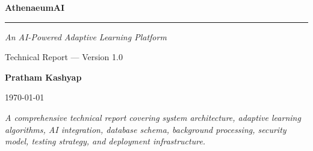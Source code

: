 \documentclass[12pt,a4paper]{article}
\begin{document}
\begin{titlepage}
    \centering
    \vspace*{3cm}

    {\Huge \bfseries \textcolor{primary}{AthenaeumAI}\par}
    \vspace{0.5cm}
    \rule{0.6\textwidth}{1pt}\par
    \vspace{1cm}
    {\Large \itshape An AI-Powered Adaptive Learning Platform\par}
    \vspace{0.5cm}
    {\large Technical Report --- Version 1.0\par}

    \vspace{4cm}

    {\Large \bfseries Pratham Kashyap\par}
    \vspace{0.5cm}
    {\large \today\par}

    \vfill

    {\normalsize \textit{A comprehensive technical report covering system architecture, adaptive learning algorithms, AI integration, database schema, background processing, security model, testing strategy, and deployment infrastructure.}\par}
\end{titlepage}

\newpage

\begin{abstract}
\noindent AthenaeumAI is a full-stack, AI-powered learning platform that generates quizzes, flashcards, analytics, and tutoring experiences from uploaded study material. Unlike static quiz generators, AthenaeumAI tracks per-topic mastery using exponential decay models, implements the SM-2 spaced repetition algorithm for flashcard scheduling, and employs a Retrieval-Augmented Generation (RAG) pipeline for hallucination-resistant AI tutoring. The system uses a containerized microservices architecture with React, Node.js/Express, MongoDB (with replica-set transactions), Redis, and BullMQ for durable asynchronous processing. This report documents the complete technical design, implementation decisions, and testing methodology of the v1.0 release.
\end{abstract}
\end{document}
